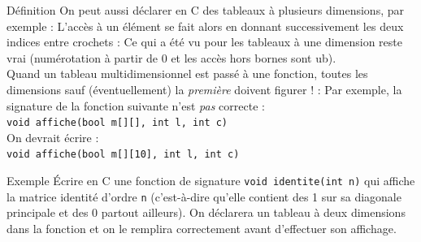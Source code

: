 \documentclass[10pt]{beamer}
\begin{document}
\begin{frame}[fragile]{\Ctitle}{\stitle}
	\begin{block}{Définition}
		On peut aussi déclarer en C des tableaux à plusieurs dimensions, par exemple :
		L'accès à un élément se fait alors en donnant successivement les deux indices entre crochets :
		Ce qui a été vu pour les tableaux à une dimension reste vrai (numérotation à partir de 0 et les accès hors bornes sont {\sc ub}).\\ \medskip
		\textcolor{BrickRed}{\small \danger } Quand un tableau multidimensionnel est passé à une fonction, toutes les dimensions sauf (éventuellement) la \textit{première} doivent figurer ! :
		Par exemple, la signature de la fonction suivante n'est \textit{pas} correcte : \\
		\texttt{void affiche(bool m[][], int l, int c)} \\
		On devrait écrire : \\
		\texttt{void affiche(bool m[][10], int l, int c)}
	\end{block}
\end{frame}

\begin{frame}[fragile]{\Ctitle}{\stitle}
	\begin{exampleblock}{Exemple}
		Écrire en C une fonction de signature \texttt{void identite(int n)} qui affiche la matrice identité d'ordre {\tt n} (c'est-à-dire qu'elle contient des 1 sur sa diagonale principale et des 0 partout ailleurs). On déclarera un tableau à deux dimensions dans la fonction et on le remplira correctement avant d'effectuer son affichage.
	\end{exampleblock}
\end{frame}
\end{document}
